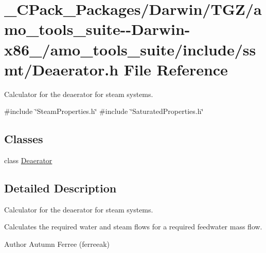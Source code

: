 \hypertarget{___c_pack___packages_2_darwin_2_t_g_z_2amo__tools__suite--_darwin-x86__64_2amo__tools__suite_2include_2ssmt_2_deaerator_8h}{}\section{\+\_\+\+C\+Pack\+\_\+\+Packages/\+Darwin/\+T\+G\+Z/amo\+\_\+tools\+\_\+suite-\/-\/\+Darwin-\/x86\+\_/amo\+\_\+tools\+\_\+suite/include/ssmt/\+Deaerator.h File Reference}
\label{___c_pack___packages_2_darwin_2_t_g_z_2amo__tools__suite--_darwin-x86__64_2amo__tools__suite_2include_2ssmt_2_deaerator_8h}


Calculator for the deaerator for steam systems.  


{\ttfamily \#include \char`\"{}Steam\+Properties.\+h\char`\"{}}\newline
{\ttfamily \#include \char`\"{}Saturated\+Properties.\+h\char`\"{}}\newline
\subsection*{Classes}
\begin{DoxyCompactItemize}
\item 
class \hyperlink{class_deaerator}{Deaerator}
\end{DoxyCompactItemize}


\subsection{Detailed Description}
Calculator for the deaerator for steam systems. 

Calculates the required water and steam flows for a required feedwater mass flow.

\begin{DoxyAuthor}{Author}
Autumn Ferree (ferreeak) 
\end{DoxyAuthor}
